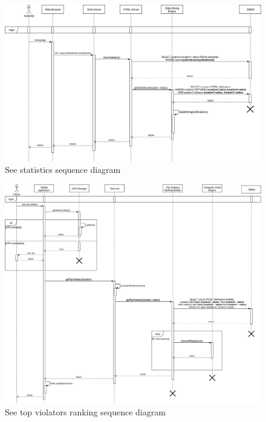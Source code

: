 \documentclass{article}
\begin{document}
	\begin{figure}[h]
		\includegraphics[width=\linewidth]{images/See_statistics_sequence_diagram.png}
		\caption{See statistics sequence diagram}
	\end{figure}
	\begin{figure}[h]
		\includegraphics[width=\linewidth]{images/See_Top_Violators_Sequence_Diagram.png}
		\caption{See top violators ranking sequence diagram}
	\end{figure}
\end{document}
